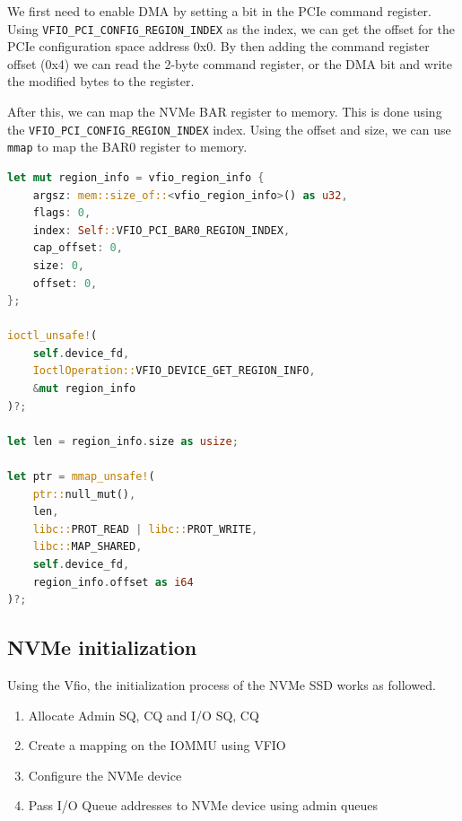 We first need to enable DMA by setting a bit in the PCIe command register.
Using \texttt{VFIO\_PCI\_CONFIG\_REGION\_INDEX} as the index, we can get the offset for the PCIe configuration space address 0x0. By then adding the command register offset (0x4) we can read the 2-byte command register, or the DMA bit and write the modified bytes to the register.

After this, we can map the NVMe BAR register to memory. This is done using the \texttt{VFIO\_PCI\_CONFIG\_REGION\_INDEX} index. Using the offset and size, we can use \texttt{mmap} to map the BAR0 register to memory.

\begin{minipage}{.95\linewidth}
    \begin{lstlisting}[language=Rust,caption={Mapping the BAR0 NVMe register to memory}, label=lst:bar0map]
let mut region_info = vfio_region_info {
    argsz: mem::size_of::<vfio_region_info>() as u32,
    flags: 0,
    index: Self::VFIO_PCI_BAR0_REGION_INDEX,
    cap_offset: 0,
    size: 0,
    offset: 0,
};

ioctl_unsafe!(
    self.device_fd,
    IoctlOperation::VFIO_DEVICE_GET_REGION_INFO,
    &mut region_info
)?;

let len = region_info.size as usize;

let ptr = mmap_unsafe!(
    ptr::null_mut(),
    len,
    libc::PROT_READ | libc::PROT_WRITE,
    libc::MAP_SHARED,
    self.device_fd,
    region_info.offset as i64
)?; 
\end{lstlisting}
\end{minipage}

\subsection{NVMe initialization}\label{sec:nvmeinit}
Using the Vfio, the initialization process of the NVMe SSD works as followed.

\begin{enumerate}
    \item Allocate Admin SQ, CQ and I/O SQ, CQ
    \item Create a mapping on the IOMMU using VFIO
    \item Configure the NVMe device
    \item Pass I/O Queue addresses to NVMe device using admin queues
\end{enumerate}

